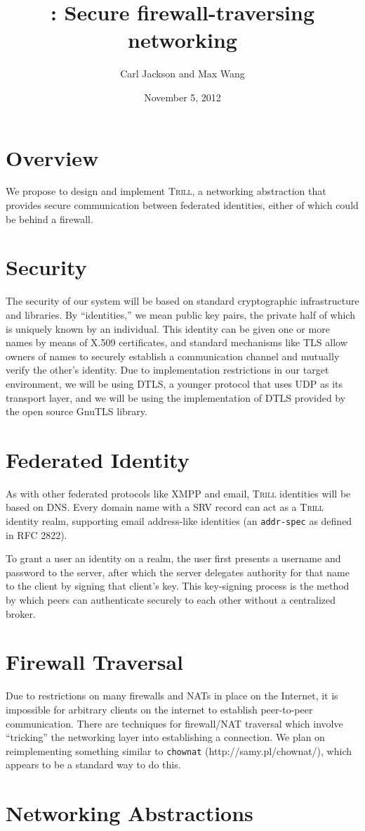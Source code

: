 \documentclass[12pt]{article}
\title{\Trill: Secure firewall-traversing networking}
\author{Carl Jackson and Max Wang}
\date{November 5, 2012}
\makeatletter
\newcommand{\Trill}{\textsc{Trill}\xspace}
\renewcommand{\maketitle}{%
  \thispagestyle{plain}%
  \begin{center}%
    {\LARGE \@title \par}%
    {\large \@author \par}%
    {\large \@date \par}%
  \end{center}%
}
\makeatother
\begin{document}
\maketitle

\section*{Overview}
We propose to design and implement \Trill, a networking abstraction that
provides secure communication between federated identities, either of which
could be behind a firewall.

\section*{Security}
The security of our system will be based on standard cryptographic
infrastructure and libraries. By ``identities,'' we mean public key pairs, the
private half of which is uniquely known by an individual. This identity can be
given one or more names by means of X.509 certificates, and standard mechanisms
like TLS allow owners of names to securely establish a communication channel
and mutually verify the other's identity. Due to implementation restrictions in
our target environment, we will be using DTLS, a younger protocol that uses UDP
as its transport layer, and we will be using the implementation of DTLS
provided by the open source GnuTLS library.

\section*{Federated Identity}
As with other federated protocols like XMPP and email, \Trill identities will
be based on DNS.  Every domain name with a SRV record can act as a \Trill
identity realm, supporting email address-like identities (an \verb!addr-spec!
as defined in RFC 2822).

To grant a user an identity on a realm, the user first presents a username and
password to the server, after which the server delegates authority for that
name to the client by signing that client's key. This key-signing process is
the method by which peers can authenticate securely to each other without a
centralized broker.

\section*{Firewall Traversal}
Due to restrictions on many firewalls and NATs in place on the Internet, it is
impossible for arbitrary clients on the internet to establish peer-to-peer
communication. There are techniques for firewall/NAT traversal which involve
``tricking'' the networking layer into establishing a connection. We plan on
reimplementing something similar to \texttt{chownat} (http://samy.pl/chownat/),
which appears to be a standard way to do this.

\section*{Networking Abstractions}
\end{document}
